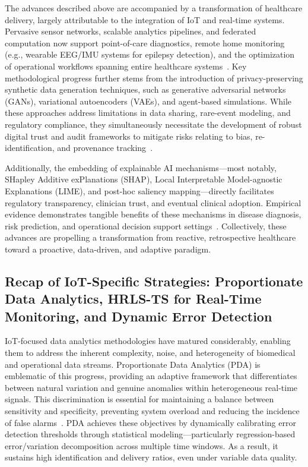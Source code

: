 \documentclass[sigconf]{acmart}
\begin{document}
The advances described above are accompanied by a transformation of healthcare delivery, largely attributable to the integration of IoT and real-time systems. Pervasive sensor networks, scalable analytics pipelines, and federated computation now support point-of-care diagnostics, remote home monitoring (e.g., wearable EEG/IMU systems for epilepsy detection), and the optimization of operational workflows spanning entire healthcare systems~\cite{ref24,ref27,ref106,ref107}. Key methodological progress further stems from the introduction of privacy-preserving synthetic data generation techniques, such as generative adversarial networks (GANs), variational autoencoders (VAEs), and agent-based simulations. While these approaches address limitations in data sharing, rare-event modeling, and regulatory compliance, they simultaneously necessitate the development of robust digital trust and audit frameworks to mitigate risks relating to bias, re-identification, and provenance tracking~\cite{ref51,ref94,ref95}.

Additionally, the embedding of explainable AI mechanisms---most notably, SHapley Additive exPlanations (SHAP), Local Interpretable Model-agnostic Explanations (LIME), and post-hoc saliency mapping---directly facilitates regulatory transparency, clinician trust, and eventual clinical adoption. Empirical evidence demonstrates tangible benefits of these mechanisms in disease diagnosis, risk prediction, and operational decision support settings~\cite{ref34,ref51,ref76,ref87,ref91}. Collectively, these advances are propelling a transformation from reactive, retrospective healthcare toward a proactive, data-driven, and adaptive paradigm.

\subsection{Recap of IoT-Specific Strategies: Proportionate Data Analytics, HRLS-TS for Real-Time Monitoring, and Dynamic Error Detection}

IoT-focused data analytics methodologies have matured considerably, enabling them to address the inherent complexity, noise, and heterogeneity of biomedical and operational data streams. Proportionate Data Analytics (PDA) is emblematic of this progress, providing an adaptive framework that differentiates between natural variation and genuine anomalies within heterogeneous real-time signals. This discrimination is essential for maintaining a balance between sensitivity and specificity, preventing system overload and reducing the incidence of false alarms~\cite{ref106}. PDA achieves these objectives by dynamically calibrating error detection thresholds through statistical modeling---particularly regression-based error/variation decomposition across multiple time windows. As a result, it sustains high identification and delivery ratios, even under variable data quality.
\end{document}
